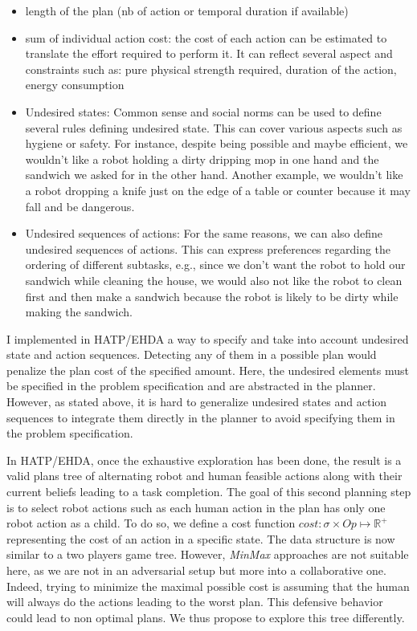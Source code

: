 \begin{itemize}
    \item length of the plan (nb of action or temporal duration if available)
    \item sum of individual action cost: the cost of each action can be estimated to translate the effort required to perform it. It can reflect several aspect and constraints such as: pure physical strength required, duration of the action, energy consumption
    \item Undesired states: Common sense and social norms can be used to define several rules defining undesired state. This can cover various aspects such as hygiene or safety. For instance, despite being possible and maybe efficient, we wouldn't like a robot holding a dirty dripping mop in one hand and the sandwich we asked for in the other hand. Another example, we wouldn't like a robot dropping a knife just on the edge of a table or counter because it may fall and be dangerous. 
    \item Undesired sequences of actions: For the same reasons, we can also define undesired sequences of actions. This can express preferences regarding the ordering of different subtasks, e.g., since we don't want the robot to hold our sandwich while cleaning the house, we would also not like the robot to clean first and then make a sandwich because the robot is likely to be dirty while making the sandwich.  
\end{itemize}

I implemented in HATP/EHDA a way to specify and take into account undesired state and action sequences. Detecting any of them in a possible plan would penalize the plan cost of the specified amount. Here, the undesired elements must be specified in the problem specification and are abstracted in the planner. However, as stated above, it is hard to generalize undesired states and action sequences to integrate them directly in the planner to avoid specifying them in the problem specification.

In HATP/EHDA, once the exhaustive exploration has been done, the result is a valid plans tree of alternating robot and human feasible actions along with their current beliefs leading to a task completion. The goal of this second planning step is to select robot actions such as each human action in the plan has only one robot action as a child.
To do so, we define a cost function $cost: \sigma \times Op \mapsto \mathbb{R}^+$ representing the cost of an action in a specific state. The data structure is now similar to a two players game tree. However, \textit{MinMax} approaches are not suitable here, as we are not in an adversarial setup but more into a collaborative one. Indeed, trying to minimize the maximal possible cost is assuming that the human will always do the actions leading to the worst plan. This defensive behavior could lead to non optimal plans. We thus propose to explore this tree differently.

